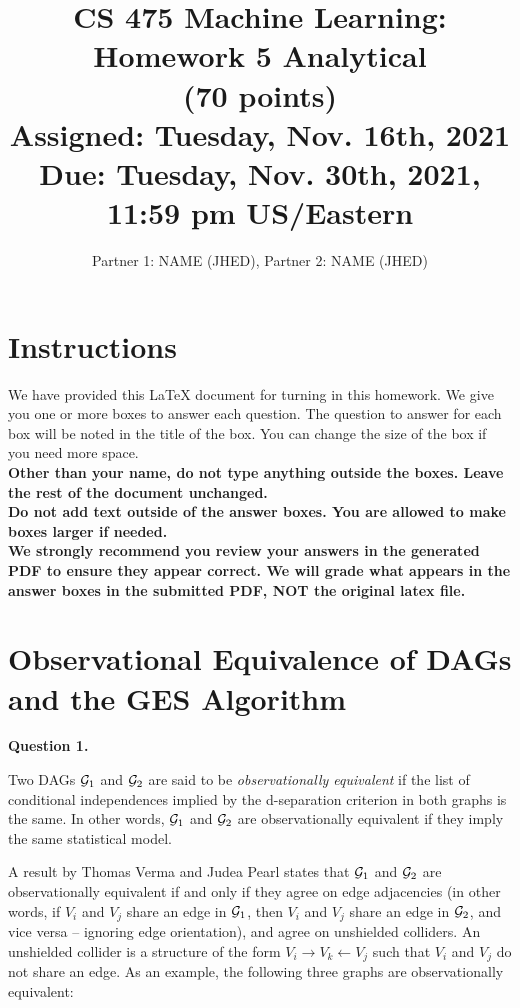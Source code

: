 \documentclass[11pt]{article}
\title{CS 475 Machine Learning: Homework 5 Analytical \\
(70 points)\\
\Large{Assigned: Tuesday, Nov. 16th, 2021} \\
\Large{Due: Tuesday, Nov. 30th, 2021, 11:59 pm US/Eastern}}
\author{Partner 1: NAME (JHED), Partner 2:  NAME (JHED)}
\date{}
\begin{document}
\maketitle
\thispagestyle{headings}

\section*{Instructions }
We have provided this \LaTeX{} document for turning in this homework. We give you one or more boxes to answer each question.  The question to answer for each box will be noted in the title of the box.  You can change the size of the box if you need more space.\\

{\bf Other than your name, do not type anything outside the boxes. Leave the rest of the document unchanged.}\\


\textbf{
  Do
  not add text outside of the answer boxes.  You are allowed to make boxes larger if needed.
  }\\


\textbf{We strongly recommend you review your answers in the generated PDF to
  ensure they appear correct. We will grade what appears in the answer boxes in
  the submitted PDF, NOT the original latex file.}


\pagebreak
\section*{Observational Equivalence of DAGs and the GES Algorithm}

{\bf Question 1.}

Two DAGs ${\cal G}_1$ and ${\cal G}_2$ are said to be \emph{observationally equivalent} if the list of conditional independences implied by the d-separation criterion in both graphs is the same.  In other words, ${\cal G}_1$ and ${\cal G}_2$ are observationally equivalent if they imply the same statistical model.

A result by Thomas Verma and Judea Pearl states that ${\cal G}_1$ and ${\cal G}_2$ are observationally equivalent if and only if they agree on edge adjacencies (in other words, if $V_i$ and $V_j$ share an edge in ${\cal G}_1$, then $V_i$ and $V_j$ share an edge in ${\cal G}_2$, and vice versa -- ignoring edge orientation), and agree on unshielded colliders.  An unshielded collider is a structure of the form $V_i \to V_k \gets V_j$ such that $V_i$ and $V_j$ do not share an edge.  As an example, the following three graphs are observationally equivalent:
\end{document}
